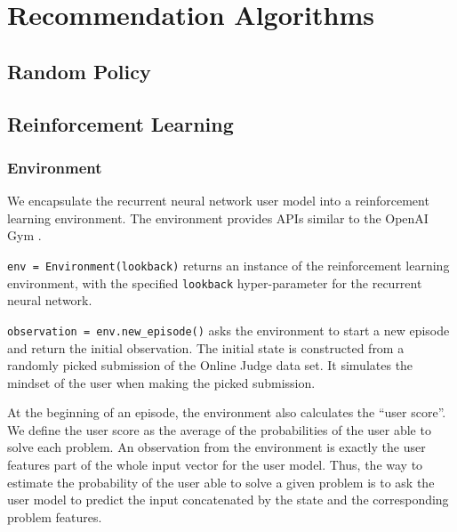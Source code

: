 
\chapter{Recommendation Algorithms}


\section{Random Policy}


\section{Reinforcement Learning}

    \subsection{Environment}

        We encapsulate the recurrent neural network user model into a reinforcement learning environment.
        The environment provides APIs similar to the OpenAI Gym \cite{brockman_openai_2016}.

        \verb|env = Environment(lookback)| returns an instance of the reinforcement learning environment,
        with the specified \verb|lookback| hyper-parameter for the recurrent neural network.

        \verb|observation = env.new_episode()| asks the environment to start a new episode and return the initial observation.
        The initial state is constructed from a randomly picked submission of the Online Judge data set.
        It simulates the mindset of the user when making the picked submission.

        At the beginning of an episode, the environment also calculates the ``user score''.
        We define the user score as the average of the probabilities of the user able to solve each problem.
        An observation from the environment is exactly the user features part of the whole input vector for the user model.
        Thus, the way to estimate the probability of the user able to solve a given problem
        is to ask the user model to predict the input concatenated by the state and the corresponding problem features.

